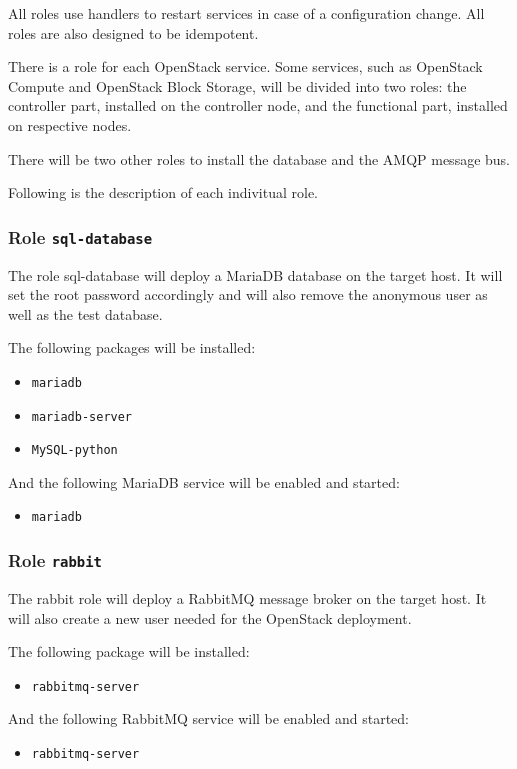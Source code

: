 All roles use handlers to restart services in case of a configuration change. All roles are also designed to be idempotent.

There is a role for each OpenStack service. Some services, such as OpenStack Compute and OpenStack Block Storage, will be divided into two roles: the controller part, installed on the controller node, and the functional part, installed on respective nodes.

There will be two other roles to install the database and the AMQP message bus.

Following is the description of each indivitual role.

\subsubsection*{Role \texttt{sql-database}}
The role sql-database will deploy a MariaDB database on the target host. It will set the root password accordingly and will also remove the anonymous user as well as the test database.

The following packages will be installed:
\begin{itemize}
\item{\texttt{mariadb}}
\item{\texttt{mariadb-server}}
\item{\texttt{MySQL-python}}
\end{itemize}

And the following MariaDB service will be enabled and started:
\begin{itemize}
\item{\texttt{mariadb}}
\end{itemize}

\subsubsection*{Role \texttt{rabbit}}
The rabbit role will deploy a RabbitMQ message broker on the target host. It will also create a new user needed for the OpenStack deployment.

The following package will be installed:
\begin{itemize}
  \item{\texttt{rabbitmq-server}}
\end{itemize}

And the following RabbitMQ service will be enabled and started:
\begin{itemize}
  \item{\texttt{rabbitmq-server}}
\end{itemize}

